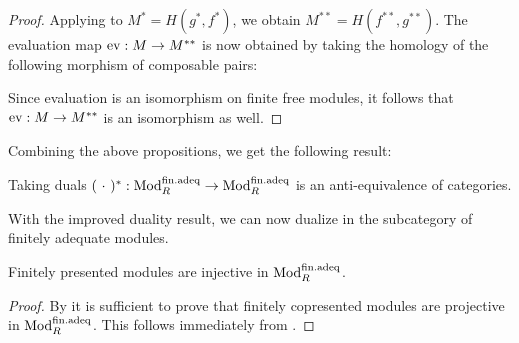\begin{proof}
  Applying  to $M^\ast = H(g^\ast, f^\ast)$, we obtain $M^{\ast\ast} = H(f^{\ast\ast}, g^{\ast\ast})$.
  The evaluation map $\mathrm{ev} : M \to M^{\ast\ast}$ is now obtained by taking the homology of the following morphism of composable pairs:
  \begin{center}
  \end{center}
  Since evaluation is an isomorphism on finite free modules, it follows that $\mathrm{ev} : M \to M^{\ast\ast}$ is an isomorphism as well.
\end{proof}

Combining the above propositions, we get the following result:

\begin{corollary}\label{cor:dual-equiv}
  Taking duals $(\ \cdot\ )^{\ast} : \textup{Mod}_{R}^{\mathrm{fin.adeq}} \rightarrow \textup{Mod}_{R}^{\mathrm{fin.adeq}}$ is an anti-equivalence of categories. \earlyqed
\end{corollary}

With the improved duality result, we can now dualize  in the subcategory of finitely adequate modules.

\begin{proposition}\label{prp:fp-is-inj}
  Finitely presented modules are injective in $\textup{Mod}_{R}^{\mathrm{fin.adeq}}$.
\end{proposition}

\begin{proof}
  By  it is sufficient to prove that finitely copresented modules are projective in $\textup{Mod}_{R}^{\mathrm{fin.adeq}}$.
  This follows immediately from .
\end{proof}


